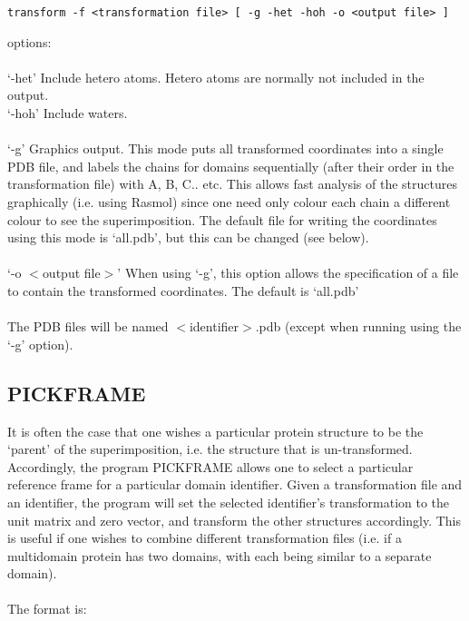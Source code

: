 \begin{scriptsize}\begin{verbatim}
transform -f <transformation file> [ -g -het -hoh -o <output file> ]
\end{verbatim} \end{scriptsize}

options:\\
\\
`-het' Include hetero atoms.  Hetero atoms are normally not included
in the output.\\
`-hoh' Include waters.\\
\\
`-g' Graphics output.  This mode puts all transformed coordinates
into a single PDB file, and labels the chains for domains
sequentially (after their order in the transformation file) with A,
B, C.. etc.  This allows fast analysis of the structures
graphically (i.e. using Rasmol) since one need only colour each
chain a different colour to see the superimposition.  The default
file for writing the coordinates using this mode is `all.pdb', but
this can be changed (see below).\\
\\
`-o $<$output file$>$'  When using `-g', this option allows the
specification of a file to contain the transformed coordinates.
The default is `all.pdb'\\
\\
The PDB files will be named $<$identifier$>$.pdb (except when running using the `-g'
option).

\subsection{PICKFRAME}

It is often the case that one wishes a particular protein structure
to be the `parent' of the superimposition, i.e. the structure that
is un-transformed.  Accordingly, the program PICKFRAME allows
one to select a particular reference frame for a particular domain
identifier.  Given a transformation file and an identifier, the
program will set the selected identifier's transformation to the
unit matrix and zero vector, and transform the other structures
accordingly.  This is useful if one wishes to combine different
transformation files (i.e. if a multidomain protein has
two domains, with each being similar to a separate domain).\\
\\
The format is:\\

